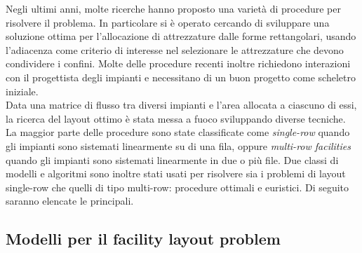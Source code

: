 \documentclass[12pt,a4paper,openright,twoside]{report}
\begin{document}
Negli ultimi anni, molte ricerche hanno proposto una variet\`{a} di procedure per risolvere il problema. In particolare si \`{e} operato cercando di sviluppare una soluzione ottima per l'allocazione di attrezzature dalle forme rettangolari, usando l'adiacenza come criterio di interesse nel selezionare le attrezzature che devono condividere i confini. Molte delle procedure recenti inoltre richiedono interazioni con il progettista degli impianti e necessitano di un buon progetto come scheletro iniziale.\\
Data una matrice di flusso tra diversi impianti e l'area allocata a ciascuno di essi, la ricerca del layout ottimo \`{e} stata messa a fuoco sviluppando diverse tecniche. La maggior parte delle procedure sono state classificate come \textit{single-row} quando gli impianti sono sistemati linearmente su di una fila, oppure \textit{multi-row facilities} quando gli impianti sono sistemati linearmente in due o pi\`{u} file. Due classi di modelli e algoritmi sono inoltre stati usati per risolvere sia i problemi di layout single-row che quelli di tipo multi-row: procedure ottimali e euristici. Di seguito saranno elencate le principali.

\subsection{Modelli per il facility layout problem}
\end{document}
